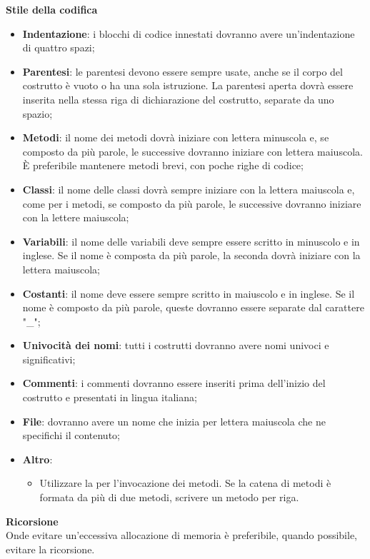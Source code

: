 \textbf{Stile della codifica}
\begin{itemize}
\item \textbf{Indentazione}: i blocchi di codice innestati dovranno avere un'indentazione di quattro spazi;
\item \textbf{Parentesi}: le parentesi devono essere sempre usate, anche se il corpo del costrutto è vuoto o ha una sola istruzione. La parentesi aperta dovrà essere inserita nella stessa riga di dichiarazione del costrutto, separate da uno spazio; 
\item \textbf{Metodi}: il nome dei metodi dovrà iniziare con lettera minuscola e, se composto da più parole, le successive dovranno iniziare con lettera maiuscola. È preferibile mantenere metodi brevi, con poche righe di codice;
\item \textbf{Classi}: il nome delle classi dovrà sempre iniziare con la lettera maiuscola e, come per i metodi, se composto da più parole, le successive dovranno iniziare con la lettere maiuscola;
\item \textbf{Variabili}: il nome delle variabili deve sempre essere scritto in minuscolo e in inglese. Se il nome è composta da più parole, la seconda dovrà iniziare con la lettera maiuscola;
\item \textbf{Costanti}: il nome deve essere sempre scritto in maiuscolo e in inglese. Se il nome è composto da più parole, queste dovranno essere separate dal carattere "\_";
\item \textbf{Univocità dei nomi}: tutti i costrutti dovranno avere nomi univoci e significativi;
\item \textbf{Commenti}: i commenti dovranno essere inseriti prima dell'inizio del costrutto e presentati in lingua italiana;
\item \textbf{File}: dovranno avere un nome che inizia per lettera maiuscola che ne specifichi il contenuto;
\item \textbf{Altro}:
	\begin{itemize}
		\item Utilizzare la  per l'invocazione dei metodi. Se la catena di metodi è formata da più di due metodi, scrivere un metodo per riga.
	\end{itemize}
\end{itemize}
\textbf{Ricorsione} \mbox{} \\
Onde evitare un'eccessiva allocazione di memoria è preferibile, quando possibile, evitare la ricorsione.

\newpage

